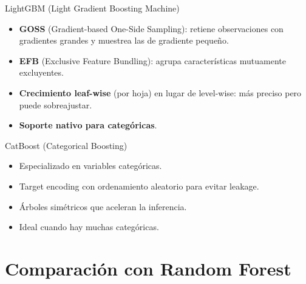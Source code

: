 \documentclass[aspectratio=169, 10pt, xcolor=table]{beamer}
\begin{document}
\begin{frame}{LightGBM (Light Gradient Boosting Machine)}
    \begin{itemize}
        \item \textbf{GOSS} (Gradient-based One-Side Sampling): retiene observaciones con gradientes grandes y muestrea las de gradiente pequeño.
        \item \textbf{EFB} (Exclusive Feature Bundling): agrupa características mutuamente excluyentes.
        \item \textbf{Crecimiento leaf-wise} (por hoja) en lugar de level-wise: más preciso pero puede sobreajustar.
        \item \textbf{Soporte nativo para categóricas}.
    \end{itemize}
\end{frame}

\begin{frame}{CatBoost (Categorical Boosting)}
    \begin{itemize}
        \item Especializado en variables categóricas.
        \item Target encoding con ordenamiento aleatorio para evitar leakage.
        \item Árboles simétricos que aceleran la inferencia.
        \item Ideal cuando hay muchas categóricas.
    \end{itemize}
\end{frame}

\section{Comparación con Random Forest}
\end{document}
